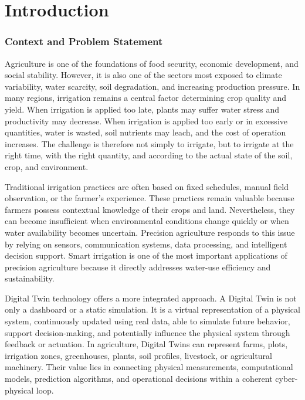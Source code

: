 \begingroup
\part{Introduction}
\renewcommand{\thesection}{\arabic{section}}
\setcounter{section}{0}
\makeatletter
\def\toclevel@section{0}
\makeatother

\section{Context and Problem Statement}

Agriculture is one of the foundations of food security, economic development, and social stability. However, it is also one of the sectors most exposed to climate variability, water scarcity, soil degradation, and increasing production pressure. In many regions, irrigation remains a central factor determining crop quality and yield. When irrigation is applied too late, plants may suffer water stress and productivity may decrease. When irrigation is applied too early or in excessive quantities, water is wasted, soil nutrients may leach, and the cost of operation increases. The challenge is therefore not simply to irrigate, but to irrigate at the right time, with the right quantity, and according to the actual state of the soil, crop, and environment.

Traditional irrigation practices are often based on fixed schedules, manual field observation, or the farmer's experience. These practices remain valuable because farmers possess contextual knowledge of their crops and land. Nevertheless, they can become insufficient when environmental conditions change quickly or when water availability becomes uncertain. Precision agriculture responds to this issue by relying on sensors, communication systems, data processing, and intelligent decision support. Smart irrigation is one of the most important applications of precision agriculture because it directly addresses water-use efficiency and sustainability.

Digital Twin technology offers a more integrated approach. A Digital Twin is not only a dashboard or a static simulation. It is a virtual representation of a physical system, continuously updated using real data, able to simulate future behavior, support decision-making, and potentially influence the physical system through feedback or actuation. In agriculture, Digital Twins can represent farms, plots, irrigation zones, greenhouses, plants, soil profiles, livestock, or agricultural machinery. Their value lies in connecting physical measurements, computational models, prediction algorithms, and operational decisions within a coherent cyber-physical loop.

